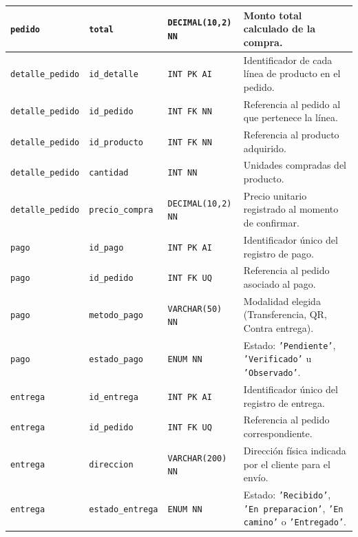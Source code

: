 {\begin{xltabular}{\textwidth}{|>{\raggedright\arraybackslash}p{2.6cm}|>{\raggedright\arraybackslash}p{2.8cm}|>{\raggedright\arraybackslash}p{2.8cm}|X|}
    \hline
    \texttt{pedido} & \texttt{total} & \texttt{DECIMAL(10,2) NN} & Monto total calculado de la compra. \\*
    \hline
    \texttt{detalle\_pedido} & \texttt{id\_detalle} & \texttt{INT PK AI} & Identificador de cada línea de producto en el pedido. \\*
    \hline
    \texttt{detalle\_pedido} & \texttt{id\_pedido} & \texttt{INT FK NN} & Referencia al pedido al que pertenece la línea. \\*
    \hline
    \texttt{detalle\_pedido} & \texttt{id\_producto} & \texttt{INT FK NN} & Referencia al producto adquirido. \\*
    \hline
    \texttt{detalle\_pedido} & \texttt{cantidad} & \texttt{INT NN} & Unidades compradas del producto. \\*
    \hline
    \texttt{detalle\_pedido} & \texttt{precio\_compra} & \texttt{DECIMAL(10,2) NN} & Precio unitario registrado al momento de confirmar. \\*
    \hline
    \texttt{pago} & \texttt{id\_pago} & \texttt{INT PK AI} & Identificador único del registro de pago. \\*
    \hline
    \texttt{pago} & \texttt{id\_pedido} & \texttt{INT FK UQ} & Referencia al pedido asociado al pago. \\*
    \hline
    \texttt{pago} & \texttt{metodo\_pago} & \texttt{VARCHAR(50) NN} & Modalidad elegida (Transferencia, QR, Contra entrega). \\*
    \hline
    \texttt{pago} & \texttt{estado\_pago} & \texttt{ENUM NN} & Estado: \texttt{'Pendiente'}, \texttt{'Verificado'} u \texttt{'Observado'}. \\*
    \hline
    \texttt{entrega} & \texttt{id\_entrega} & \texttt{INT PK AI} & Identificador único del registro de entrega. \\*
    \hline
    \texttt{entrega} & \texttt{id\_pedido} & \texttt{INT FK UQ} & Referencia al pedido correspondiente. \\*
    \hline
    \texttt{entrega} & \texttt{direccion} & \texttt{VARCHAR(200) NN} & Dirección física indicada por el cliente para el envío. \\*
    \hline
    \texttt{entrega} & \texttt{estado\_entrega} & \texttt{ENUM NN} & Estado: \texttt{'Recibido'}, \texttt{'En preparacion'}, \texttt{'En camino'} o \texttt{'Entregado'}. \\
    \hline
\end{xltabular}
}
